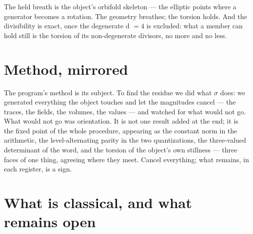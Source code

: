 \documentclass[11pt]{article}
\theoremstyle{plain}
\theoremstyle{definition}
\theoremstyle{remark}
\begin{document}
The held breath is the object's orbifold skeleton — the elliptic points where a generator becomes a rotation. The geometry breathes; the torsion holds. And the divisibility is exact, once the degenerate d \(= 4\) is excluded: what a member can hold still is the torsion of its non-degenerate divisors, no more and no less.

\section{Method, mirrored}

The program's method is its subject. To find the residue we did what \(\sigma \) does: we generated everything the object touches and let the magnitudes cancel — the traces, the fields, the volumes, the values — and watched for what would not go. What would not go was orientation. It is not one result added at the end; it is the fixed point of the whole procedure, appearing as the constant norm in the arithmetic, the level-alternating parity in the two quantizations, the three-valued determinant of the word, and the torsion of the object's own stillness — three faces of one thing, agreeing where they meet. Cancel everything; what remains, in each register, is a sign.

\section{What is classical, and what remains open}
\end{document}
